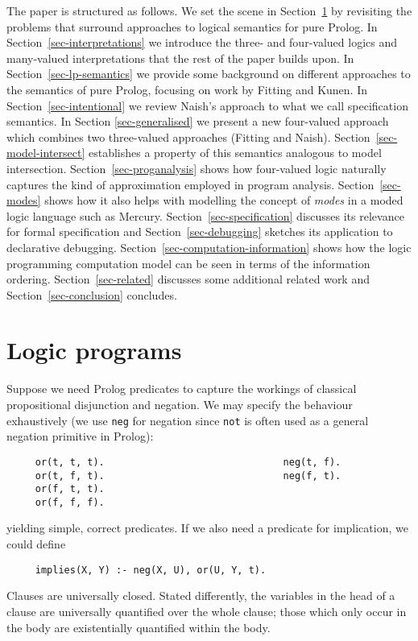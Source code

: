 \documentclass{tlp}
\begin{document}
The paper is structured as follows.  
We set the scene in Section~\ref{sec-scene} by revisiting the problems
that surround approaches to logical semantics for pure Prolog.
In Section~\ref{sec-interpretations}
we introduce the three- and four-valued logics and many-valued 
interpretations that the rest of the paper builds upon.
In Section~\ref{sec-lp-semantics} we provide some background on 
different approaches to the semantics of pure Prolog, focusing on
work by Fitting and Kunen.
In Section~\ref{sec-intentional} we review Naish's approach to
what we call specification semantics.
In Section \ref{sec-generalised} we present a new four-valued approach
which combines two three-valued approaches (Fitting and Naish).
Section~\ref{sec-model-intersect} establishes a
property of this semantics analogous to model intersection.
Section~\ref{sec-proganalysis} shows how four-valued logic 
naturally captures the kind of approximation employed in program
analysis.
Section~\ref{sec-modes} shows how it also helps with modelling the 
concept of \emph{modes} in a moded logic language such as Mercury.
Section~\ref{sec-specification} discusses its relevance for
formal specification
and Section~\ref{sec-debugging} sketches its application to 
declarative debugging.
Section~\ref{sec-computation-information} shows how the logic programming
computation model can be seen in terms of the information ordering.
Section~\ref{sec-related} discusses some additional related work
and Section~\ref{sec-conclusion} concludes.


\section{Logic programs}
\label{sec-scene}

Suppose we need Prolog predicates to capture the workings of
classical propositional disjunction and negation.
We may specify the behaviour exhaustively (we use \texttt{neg} for
negation since \texttt{not} is often used as a general negation primitive in
Prolog):
\pagebreak
\begin{verbatim}
     or(t, t, t).                               neg(t, f).
     or(t, f, t).                               neg(f, t).
     or(f, t, t).
     or(f, f, f).
\end{verbatim}
yielding simple, correct predicates.
If we also need a predicate for implication, we could define
\begin{verbatim}
     implies(X, Y) :- neg(X, U), or(U, Y, t).
\end{verbatim}
Clauses are universally closed.
Stated differently,
the variables in the head of a clause are universally quantified over the
whole clause; those which only occur in the body are existentially
quantified within the body.
\end{document}
